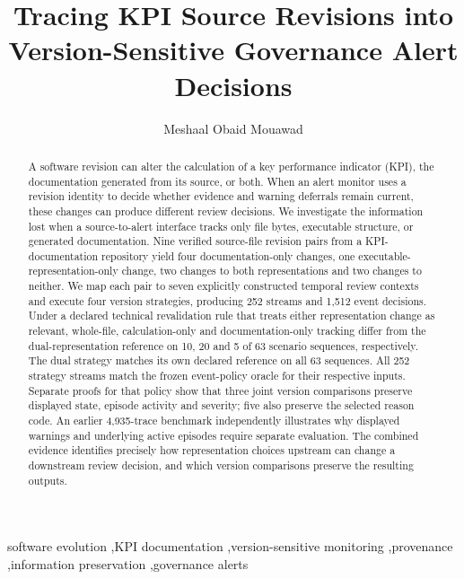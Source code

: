 \documentclass[preprint,11pt]{elsarticle}
\begin{document}
\begin{frontmatter}
\title{Tracing KPI Source Revisions into Version-Sensitive Governance Alert Decisions}
\author[msu]{Meshaal Obaid Mouawad}
\address[msu]{Department of Electrical and Computer Engineering, Mississippi State University, Box 9571, Mississippi State, MS 39762, USA}
\begin{abstract}
A software revision can alter the calculation of a key performance indicator (KPI), the documentation generated from its source, or both. When an alert monitor uses a revision identity to decide whether evidence and warning deferrals remain current, these changes can produce different review decisions. We investigate the information lost when a source-to-alert interface tracks only file bytes, executable structure, or generated documentation. Nine verified source-file revision pairs from a KPI-documentation repository yield four documentation-only changes, one executable-representation-only change, two changes to both representations and two changes to neither. We map each pair to seven explicitly constructed temporal review contexts and execute four version strategies, producing 252 streams and 1,512 event decisions. Under a declared technical revalidation rule that treats either representation change as relevant, whole-file, calculation-only and documentation-only tracking differ from the dual-representation reference on 10, 20 and 5 of 63 scenario sequences, respectively. The dual strategy matches its own declared reference on all 63 sequences. All 252 strategy streams match the frozen event-policy oracle for their respective inputs. Separate proofs for that policy show that three joint version comparisons preserve displayed state, episode activity and severity; five also preserve the selected reason code. An earlier 4,935-trace benchmark independently illustrates why displayed warnings and underlying active episodes require separate evaluation. The combined evidence identifies precisely how representation choices upstream can change a downstream review decision, and which version comparisons preserve the resulting outputs.
\end{abstract}
\begin{keyword}
software evolution \sep KPI documentation \sep version-sensitive monitoring \sep provenance \sep information preservation \sep governance alerts
\end{keyword}
\end{frontmatter}
\end{document}
